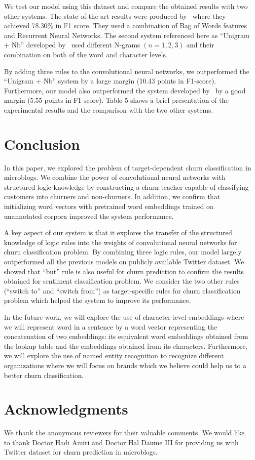 \documentclass[11pt,letterpaper]{article}
\begin{document}
We test our model using this dataset and compare the obtained results with two other systems. The state-of-the-art results were produced by~\cite{amiri2016} where they achieved 78.30\% in F1 score. They used a combination of Bag of Words features and Recurrent Neural Networks. The second system referenced here as \enquote{Unigram + Nb} developed by~\cite{amiri2015} used different N-grams \((n={1,2,3})\) and their combination on both of the word and character levels.

By adding three rules to the convolutional neural networks, we outperformed the \enquote{Unigram + Nb} system by a large margin (10.43 points in F1-score). Furthermore, our model also outperformed the system developed by~\cite{amiri2016} by a good margin (5.55 points in F1-score). Table 5 shows a brief presentation of the experimental results and the comparison with the two other systems. 


\section{Conclusion}
In this paper, we explored the problem of target-dependent churn classification in microblogs. We combine the power of convolutional neural networks with structured logic knowledge by constructing a churn teacher capable of classifying customers into churners and non-churners. In addition, we confirm that initializing word vectors with pretrained word embeddings trained on unannotated corpora improved the system performance.

A key aspect of our system is that it explores the transfer of the structured knowledge of logic rules into the weights of convolutional neural networks for churn classification problem. By combining three logic rules, our model largely outperformed all the previous models on publicly available Twitter dataset. We showed that \enquote{but} rule is also useful for churn prediction to confirm the results obtained for sentiment classification problem. We consider the two other rules (\enquote{switch to} and \enquote{switch from}) as target-specific rules for churn classification problem which helped the system to improve its performance.

In the future work, we will explore the use of character-level embeddings where we will represent word in a sentence by a word vector representing the concatenation of two embeddings: its equivalent word embeddings obtained from the lookup table and the embeddings obtained from its characters. Furthermore, we will explore the use of named entity recognition to recognize different organizations where we will focus on brands which we believe could help us to a better churn classification.

\section*{Acknowledgments}

We thank the anonymous reviewers for their valuable comments. We would like to thank Doctor Hadi Amiri and Doctor Hal Daume III for providing us with Twitter dataset for churn prediction in microblogs.



\end{document}
